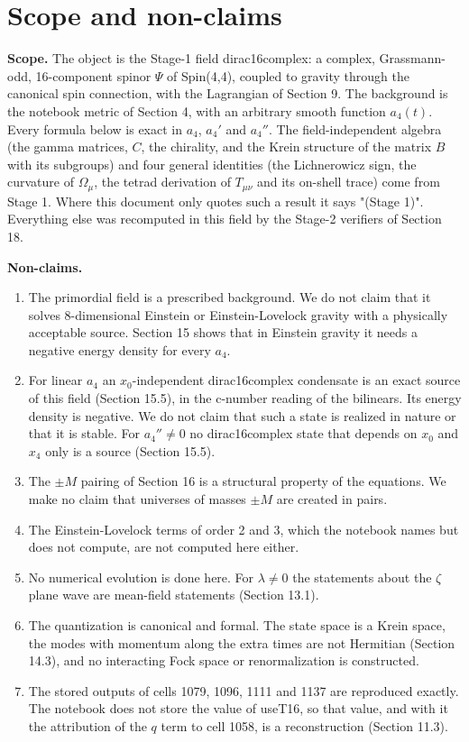 \documentclass[11pt]{article}
\begin{document}
\section{Scope and non-claims}

\textbf{Scope.} The object is the Stage-1 field dirac16complex: a complex, Grassmann-odd, 16-component spinor $\Psi$ of Spin(4,4), coupled to gravity through the canonical spin connection, with the Lagrangian of Section 9. The background is the notebook metric of Section 4, with an arbitrary smooth function $a_4(t)$. Every formula below is exact in $a_4$, $a_4'$ and $a_4''$. The field-independent algebra (the gamma matrices, $C$, the chirality, and the Krein structure of the matrix $B$ with its subgroups) and four general identities (the Lichnerowicz sign, the curvature of $\Omega_\mu$, the tetrad derivation of $T_{\mu\nu}$ and its on-shell trace) come from Stage 1. Where this document only quotes such a result it says "(Stage 1)". Everything else was recomputed in this field by the Stage-2 verifiers of Section 18.

\textbf{Non-claims.}

\begin{enumerate}
\item The primordial field is a prescribed background. We do not claim that it solves 8-dimensional Einstein or Einstein-Lovelock gravity with a physically acceptable source. Section 15 shows that in Einstein gravity it needs a negative energy density for every $a_4$.
\item For linear $a_4$ an $x_0$-independent dirac16complex condensate is an exact source of this field (Section 15.5), in the c-number reading of the bilinears. Its energy density is negative. We do not claim that such a state is realized in nature or that it is stable. For $a_4''\ne0$ no dirac16complex state that depends on $x_0$ and $x_4$ only is a source (Section 15.5).
\item The $\pm M$ pairing of Section 16 is a structural property of the equations. We make no claim that universes of masses $\pm M$ are created in pairs.
\item The Einstein-Lovelock terms of order 2 and 3, which the notebook names but does not compute, are not computed here either.
\item No numerical evolution is done here. For $\lambda\ne0$ the statements about the $\zeta$ plane wave are mean-field statements (Section 13.1).
\item The quantization is canonical and formal. The state space is a Krein space, the modes with momentum along the extra times are not Hermitian (Section 14.3), and no interacting Fock space or renormalization is constructed.
\item The stored outputs of cells 1079, 1096, 1111 and 1137 are reproduced exactly. The notebook does not store the value of useT16, so that value, and with it the attribution of the $q$ term to cell 1058, is a reconstruction (Section 11.3).
\end{enumerate}
\end{document}
